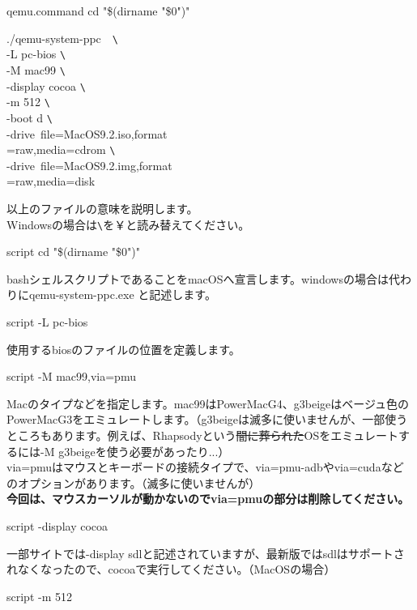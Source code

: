\documentclass[b5paper,9pt,platex,dvipdfmx]{jsarticle}
\begin{document}
\begin{multicols*}{3}
\begin{itembox}{qemu.command}
cd "\$(dirname "\$0")"

./qemu-system-ppc　\verb|\| \\
-L pc-bios \verb|\| \\
-M mac99 \verb|\| \\
-display cocoa \verb|\| \\
-m 512 \verb|\| \\
-boot d \verb|\| \\
-drive\ file=MacOS9.2.iso,format\\
=raw,media=cdrom \verb|\| \\
-drive\ file=MacOS9.2.img,format\\
=raw,media=disk \\
\end{itembox}
以上のファイルの意味を説明します。\\
Windowsの場合は\verb|\|を￥と読み替えてください。\\
\begin{itembox}{script}
  cd "\$(dirname "\$0")"\\
\end{itembox}
bashシェルスクリプトであることをmacOSへ宣言します。windowsの場合は代わりにqemu-system-ppc.exe と記述します。\\
\begin{itembox}{script}
-L pc-bios
\end{itembox}
使用するbiosのファイルの位置を定義します。\\
\begin{itembox}{script}
-M mac99,via=pmu 
\end{itembox}
Macのタイプなどを指定します。mac99はPowerMacG4、g3beigeはベージュ色のPowerMacG3をエミュレートします。（g3beigeは滅多に使いませんが、一部使うところもあります。例えば、Rhapsodyという\sout{闇に葬られた}OSをエミュレートするには-M g3beigeを使う必要があったり...）\\
via=pmuはマウスとキーボードの接続タイプで、via=pmu-adbやvia=cudaなどのオプションがあります。（滅多に使いませんが）\\
\textbf{今回は、マウスカーソルが動かないのでvia=pmuの部分は削除してください。}\\
\begin{itembox}{script}
-display cocoa 
\end{itembox}
一部サイトでは-display sdlと記述されていますが、最新版ではsdlはサポートされなくなったので、cocoaで実行してください。（MacOSの場合）\\
\begin{itembox}{script}
-m 512 
\end{itembox}

\end{multicols*}
\end{document}

